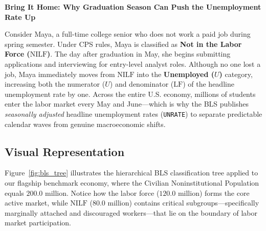 \documentclass[11pt, a4paper]{article}
\newcommand{\boxheader}[2]{\textbf{\textcolor{#1}{#2}}\par\smallskip}
\begin{document}
\begin{examplecase}
\boxheader{CourseBlue}{Bring It Home: Why Graduation Season Can Push the Unemployment Rate Up}
Consider Maya, a full-time college senior who does not work a paid job during spring semester. Under CPS rules, Maya is classified as \textbf{Not in the Labor Force ($\text{NILF}$)}. The day after graduation in May, she begins submitting applications and interviewing for entry-level analyst roles. Although no one lost a job, Maya immediately moves from $\text{NILF}$ into the \textbf{Unemployed ($U$)} category, increasing both the numerator ($U$) and denominator ($\text{LF}$) of the headline unemployment rate by one. Across the entire U.S. economy, millions of students enter the labor market every May and June—which is why the BLS publishes \emph{seasonally adjusted} headline unemployment rates (\texttt{UNRATE}) to separate predictable calendar waves from genuine macroeconomic shifts.
\end{examplecase}

\subsection*{Visual Representation}
Figure~\ref{fig:bls_tree} illustrates the hierarchical BLS classification tree applied to our flagship benchmark economy, where the Civilian Noninstitutional Population equals $200.0\text{ million}$. Notice how the labor force ($120.0\text{ million}$) forms the core active market, while $\text{NILF}$ ($80.0\text{ million}$) contains critical subgroups—specifically marginally attached and discouraged workers—that lie on the boundary of labor market participation.
\end{document}
